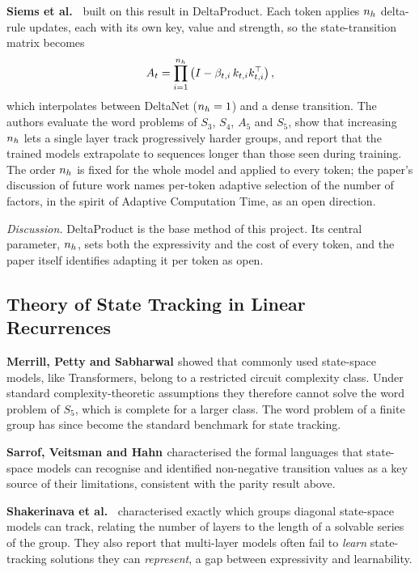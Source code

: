 \textbf{Siems et al.\ \cite{deltaproduct}} built on this result in DeltaProduct. Each token applies $n_h$ delta-rule updates, each with its own key, value and strength, so the state-transition matrix becomes
\begin{equation}
A_t = \prod_{i=1}^{n_h}\left(I - \beta_{t,i}\, k_{t,i} k_{t,i}^\top\right),
\label{eq:deltaproduct}
\end{equation}
which interpolates between DeltaNet ($n_h=1$) and a dense transition. The authors evaluate the word problems of $S_3$, $S_4$, $A_5$ and $S_5$, show that increasing $n_h$ lets a single layer track progressively harder groups, and report that the trained models extrapolate to sequences longer than those seen during training. The order $n_h$ is fixed for the whole model and applied to every token; the paper's discussion of future work names per-token adaptive selection of the number of factors, in the spirit of Adaptive Computation Time, as an open direction.

\textit{Discussion.} DeltaProduct is the base method of this project. Its central parameter, $n_h$, sets both the expressivity and the cost of every token, and the paper itself identifies adapting it per token as open.

\subsection{Theory of State Tracking in Linear Recurrences}
\textbf{Merrill, Petty and Sabharwal \cite{illusionofstate}} showed that commonly used state-space models, like Transformers, belong to a restricted circuit complexity class. Under standard complexity-theoretic assumptions they therefore cannot solve the word problem of $S_5$, which is complete for a larger class. The word problem of a finite group has since become the standard benchmark for state tracking.

\textbf{Sarrof, Veitsman and Hahn \cite{sarrof}} characterised the formal languages that state-space models can recognise and identified non-negative transition values as a key source of their limitations, consistent with the parity result above.

\textbf{Shakerinava et al.\ \cite{diagonalssm}} characterised exactly which groups diagonal state-space models can track, relating the number of layers to the length of a solvable series of the group. They also report that multi-layer models often fail to \emph{learn} state-tracking solutions they can \emph{represent}, a gap between expressivity and learnability.

